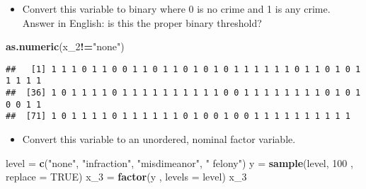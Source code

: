 \documentclass[]{article}
\newenvironment{Shaded}{\begin{snugshade}}{\end{snugshade}}
\newcommand{\KeywordTok}[1]{\textcolor[rgb]{0.13,0.29,0.53}{\textbf{#1}}}
\newcommand{\DataTypeTok}[1]{\textcolor[rgb]{0.13,0.29,0.53}{#1}}
\newcommand{\DecValTok}[1]{\textcolor[rgb]{0.00,0.00,0.81}{#1}}
\newcommand{\StringTok}[1]{\textcolor[rgb]{0.31,0.60,0.02}{#1}}
\newcommand{\OtherTok}[1]{\textcolor[rgb]{0.56,0.35,0.01}{#1}}
\newcommand{\OperatorTok}[1]{\textcolor[rgb]{0.81,0.36,0.00}{\textbf{#1}}}
\newcommand{\NormalTok}[1]{#1}
\providecommand{\tightlist}{%
  \setlength{\itemsep}{0pt}\setlength{\parskip}{0pt}}
\begin{document}
\begin{itemize}
\tightlist
\item
  Convert this variable to binary where 0 is no crime and 1 is any
  crime. Answer in English: is this the proper binary threshold?
\end{itemize}

\begin{Shaded}
\begin{Highlighting}[]
\KeywordTok{as.numeric}\NormalTok{(x_}\DecValTok{2}\OperatorTok{!=}\StringTok{"none"}\NormalTok{)}
\end{Highlighting}
\end{Shaded}

\begin{verbatim}
##   [1] 1 1 1 0 1 1 0 0 1 1 0 1 1 0 1 0 1 0 1 1 1 1 1 1 0 1 1 0 1 0 1 1 1 1 1
##  [36] 1 0 1 1 1 1 0 1 1 1 1 1 1 1 1 1 1 0 0 1 1 1 1 1 1 1 1 0 1 0 1 0 0 1 1
##  [71] 1 0 1 1 1 1 0 1 1 1 1 1 1 0 1 0 0 1 0 0 1 1 1 1 1 1 1 1 1 1
\end{verbatim}

\begin{itemize}
\tightlist
\item
  Convert this variable to an unordered, nominal factor variable.
\end{itemize}

\begin{Shaded}
\begin{Highlighting}[]
\NormalTok{level =}\StringTok{ }\KeywordTok{c}\NormalTok{(}\StringTok{"none"}\NormalTok{, }\StringTok{"infraction"}\NormalTok{, }\StringTok{"misdimeanor"}\NormalTok{, }\StringTok{" felony"}\NormalTok{)}
\NormalTok{y =}\StringTok{ }\KeywordTok{sample}\NormalTok{(level, }\DecValTok{100}\NormalTok{ , }\DataTypeTok{replace =} \OtherTok{TRUE}\NormalTok{)}
\NormalTok{x_}\DecValTok{3}\NormalTok{ =}\StringTok{ }\KeywordTok{factor}\NormalTok{(y , }\DataTypeTok{levels =}\NormalTok{ level)}
\NormalTok{x_}\DecValTok{3}
\end{Highlighting}
\end{Shaded}
\end{document}
